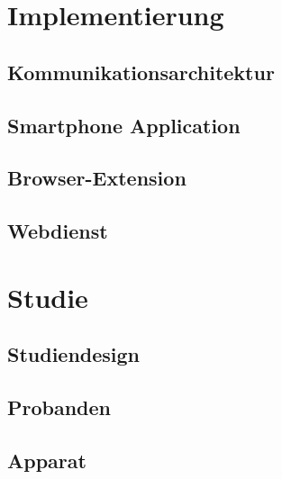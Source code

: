 \documentclass[doktyp=marbeit, twoside]{TUBAFarbeiten}
\begin{document}
\newpage
\section{Implementierung}
    \label{sec: implementierung}
    

    \subsection{Kommunikationsarchitektur}
        \label{sec: implementierung architektur}
        

    \subsection{Smartphone Application}
        \label{sec: implementierung app}
        

    \subsection{Browser-Extension}
        \label{sec: implementierung ext}
        

    \subsection{Webdienst}
        \label{sec: implementierung webservice}
        

\newpage
\section{Studie}
    \label{sec: studie}
    

    \subsection{Studiendesign}
        \label{sec: studie studiendesign}
        

    \subsection{Probanden}
        \label{sec: studie probanden}
        

    \subsection{Apparat}
        \label{sec: studie apparat}
        
\end{document}
